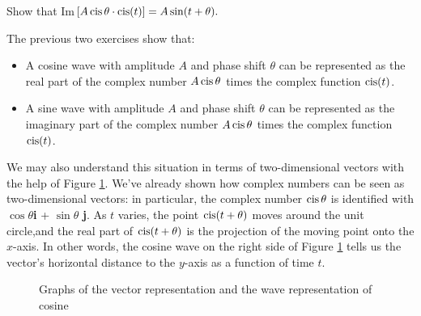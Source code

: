 \begin{exercise}{44}
Show that Im$ [A \operatorname{cis}\theta \cdot \operatorname{cis} (t)] = A \sin (t + \theta). $
\end{exercise}

\noindent
The previous two exercises show that: 

\begin{itemize}
\item
A cosine wave with amplitude $A$ and phase shift $\theta$ can be represented  as the real part of  the complex number $A \operatorname{cis}\theta$ times the complex function $\operatorname{cis}(t)$.
\item
A sine wave with amplitude $A$ and phase shift $\theta$ can be represented  as the imaginary part of  the complex number $A \operatorname{cis}\theta$ times the complex function $\operatorname{cis}(t)$.
\end{itemize}

\noindent
We may also understand this situation in terms of two-dimensional vectors with the help of Figure \ref{fig:complex:3}. We've already shown how complex numbers can be seen as two-dimensional vectors: in particular, the complex number $\operatorname{cis}\theta$ is identified with $\cos\theta$\textbf{i} + $\sin\theta$ \textbf{j}. As $t$ varies, the point $\operatorname{cis}(t+\theta)$ moves around the unit circle,and the real part of $\operatorname{cis}(t + \theta)$ is the projection of the moving point onto the $x$-axis.  In other words, the cosine wave on the right side of Figure \ref{fig:complex:3} tells us the vector's horizontal distance to the $y$-axis as a function of time $t$.

\begin{figure}[htb]
	  \caption{\label{fig:complex:3} Graphs of the vector representation and the wave representation of cosine }
\end{figure}


